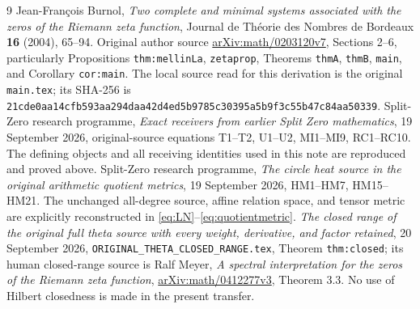 \documentclass[11pt]{article}
\begin{document}
\begin{thebibliography}{9}
 Jean-Fran\c{c}ois Burnol,
\emph{Two complete and minimal systems associated with the zeros
of the Riemann zeta function}, Journal de Th\'eorie des Nombres
de Bordeaux \textbf{16} (2004), 65--94.
Original author source \href{https://arxiv.org/abs/math/0203120v7}
{arXiv:math/0203120v7}, Sections 2--6, particularly
Propositions \texttt{thm:mellinLa}, \texttt{zetaprop},
Theorems \texttt{thmA}, \texttt{thmB}, \texttt{main}, and
Corollary \texttt{cor:main}. The local source read for this
derivation is the original \texttt{main.tex}; its SHA-256 is
\texttt{21cde0aa14cfb593aa294daa42d4ed5b9785c30395a5b9f3c55b47c84aa50339}.
 Split-Zero research programme,
\emph{Exact receivers from earlier Split Zero mathematics},
19 September 2026, original-source equations T1--T2, U1--U2,
MI1--MI9, RC1--RC10. The defining objects and all receiving
identities used in this note are reproduced and proved above.
 Split-Zero research programme,
\emph{The circle heat source in the original arithmetic quotient
metrics}, 19 September 2026, HM1--HM7, HM15--HM21.
The unchanged all-degree source, affine relation space, and
tensor metric are explicitly reconstructed in
\eqref{eq:LN}--\eqref{eq:quotientmetric}.
 \emph{The closed range of the original full
theta source with every weight, derivative, and factor retained},
20 September 2026, \texttt{ORIGINAL\_THETA\_CLOSED\_RANGE.tex},
Theorem \texttt{thm:closed}; its human closed-range source is
Ralf Meyer, \emph{A spectral interpretation for the zeros of the
Riemann zeta function}, \href{https://arxiv.org/abs/math/0412277v3}
{arXiv:math/0412277v3}, Theorem 3.3. No use of Hilbert closedness
is made in the present transfer.
\end{thebibliography}
\end{document}
